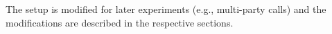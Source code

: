 The setup is modified for later experiments (e.g., multi-party calls) and the modifications are described in the respective sections.

